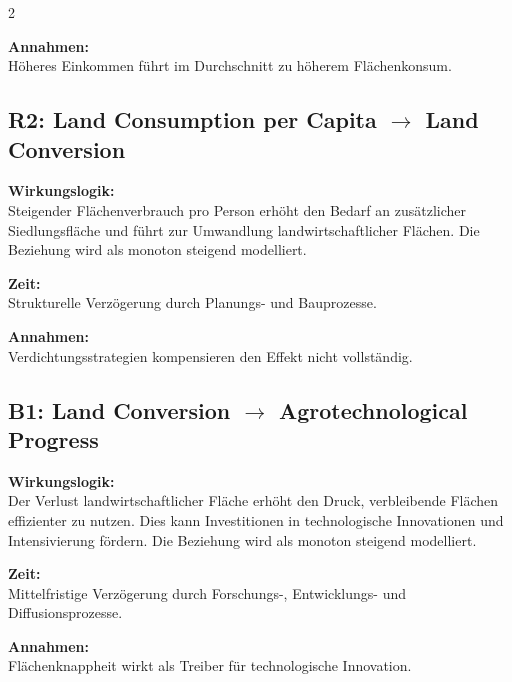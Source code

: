 \documentclass[10pt, a4paper]{article}
\begin{document}
\begin{multicols}{2}
\begin{minipage}{\linewidth}
\textbf{Annahmen:}\\
Höheres Einkommen führt im Durchschnitt zu höherem Flächenkonsum.
\end{minipage}\vspace{1em}

\begin{minipage}{\linewidth}
\subsection*{R2: Land Consumption per Capita $\rightarrow$ Land Conversion}

\textbf{Wirkungslogik:}\\
Steigender Flächenverbrauch pro Person erhöht den Bedarf an zusätzlicher Siedlungsfläche und führt zur Umwandlung landwirtschaftlicher Flächen.
Die Beziehung wird als monoton steigend modelliert.

\textbf{Zeit:}\\
Strukturelle Verzögerung durch Planungs- und Bauprozesse.

\textbf{Annahmen:}\\
Verdichtungsstrategien kompensieren den Effekt nicht vollständig.
\end{minipage}\vspace{1em}

\begin{minipage}{\linewidth}
\subsection*{B1: Land Conversion $\rightarrow$ Agrotechnological Progress}

\textbf{Wirkungslogik:}\\
Der Verlust landwirtschaftlicher Fläche erhöht den Druck, verbleibende Flächen effizienter zu nutzen.
Dies kann Investitionen in technologische Innovationen und Intensivierung fördern.
Die Beziehung wird als monoton steigend modelliert.

\textbf{Zeit:}\\
Mittelfristige Verzögerung durch Forschungs-, Entwicklungs- und Diffusionsprozesse.

\textbf{Annahmen:}\\
Flächenknappheit wirkt als Treiber für technologische Innovation.
\end{minipage}\vspace{1em}

\begin{minipage}{\linewidth}

\end{minipage}
\end{multicols}
\end{document}
